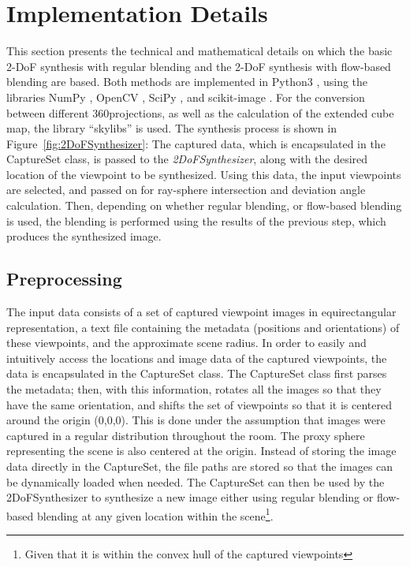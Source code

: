 \section{Implementation Details} \label{sec:impl_details}
This section presents the technical and mathematical details on which the basic 2-DoF synthesis with regular blending and the 2-DoF synthesis with flow-based blending are based. 
Both methods are implemented in Python3 \cite{python}, using the libraries NumPy \cite{numpy}, OpenCV \cite{opencv}, SciPy \cite{scipy}, and scikit-image \cite{skimage}. For the conversion between different 360\degree projections, as well as the calculation of the extended cube map, the library ``skylibs'' \cite{skylibs} is used.
The synthesis process is shown in Figure~\ref{fig:2DoFSynthesizer}: The captured data, which is encapsulated in the CaptureSet class, is passed to the \emph{2DoFSynthesizer}, along with the desired location of the viewpoint to be synthesized. Using this data, the input viewpoints are selected, and passed on for ray-sphere intersection and deviation angle calculation. Then, depending on whether regular blending, or flow-based blending is used, the blending is performed using the results of the previous step, which produces the synthesized image.

\subsection{Preprocessing}
The input data consists of a set of captured viewpoint images in equirectangular representation, a text file containing the metadata (positions and orientations) of these viewpoints, and the approximate scene radius. In order to easily and intuitively access the locations and image data of the captured viewpoints, the data is encapsulated in the CaptureSet class. The CaptureSet class first parses the metadata; then, with this information, rotates all the images so that they have the same orientation, and shifts the set of viewpoints so that it is centered around the origin (0,0,0). This is done under the assumption that images were captured in a regular distribution throughout the room. The proxy sphere representing the scene is also centered at the origin. Instead of storing the image data directly in the CaptureSet, the file paths are stored so that the images can be dynamically loaded when needed. The CaptureSet can then be used by the 2DoFSynthesizer to synthesize a new image either using regular blending or flow-based blending at any given location within the scene\footnote{Given that it is within the convex hull of the captured viewpoints}.


